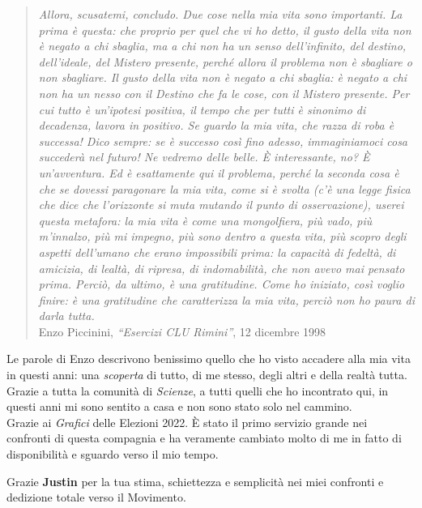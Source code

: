 \begin{quote}
    \emph{Allora, scusatemi, concludo. Due cose nella mia vita sono importanti. La prima è questa: che proprio per quel che vi ho detto, il gusto della vita non è negato a chi sbaglia, ma a chi non ha un senso dell’infinito, del destino, dell’ideale, del Mistero presente, perché allora il problema non è sbagliare o non sbagliare. Il gusto della vita non è negato a chi sbaglia: è negato a chi non ha un nesso con il Destino che fa le cose, con il Mistero presente. \emph{Per cui tutto è un’ipotesi positiva, il tempo che per tutti è sinonimo di decadenza, lavora in positivo.} Se guardo la mia vita, che razza di roba è successa! Dico sempre: se è successo così fino adesso, immaginiamoci cosa succederà nel futuro! Ne vedremo delle belle. È interessante, no? È un’avventura. Ed è esattamente qui il problema, perché la seconda cosa è che se dovessi paragonare la mia vita, come si è svolta (c’è una legge fisica che dice che l’orizzonte si muta mutando il punto di osservazione), userei questa metafora: \emph{la mia vita è come una mongolfiera, più vado, più m’innalzo, più mi impegno, più sono dentro a questa vita, più scopro degli aspetti dell’umano che erano impossibili prima: la capacità di fedeltà, di amicizia, di lealtà, di ripresa, di indomabilità, che non avevo mai pensato prima. Perciò, da ultimo, è una gratitudine. Come ho iniziato, così voglio finire: è una gratitudine che caratterizza la mia vita, perciò non ho paura di darla tutta.}} \\
    Enzo Piccinini, \textit{``Esercizi CLU Rimini''}, 12 dicembre 1998
\end{quote}

Le parole di Enzo descrivono benissimo quello che ho visto accadere alla mia vita in questi anni: una \textit{scoperta} di tutto, di me stesso, degli altri e della realtà tutta. \\


Grazie a tutta la comunità di \textit{Scienze}, a tutti quelli che ho incontrato qui, in questi anni mi sono sentito a casa e non sono stato solo nel cammino. \\


Grazie ai \textit{Grafici} delle Elezioni 2022. È stato il primo servizio grande nei confronti di questa compagnia e ha veramente cambiato molto di me in fatto di disponibilità e sguardo verso il mio tempo.

Grazie \textbf{Justin} per la tua stima, schiettezza e semplicità nei miei confronti e dedizione totale verso il Movimento.

